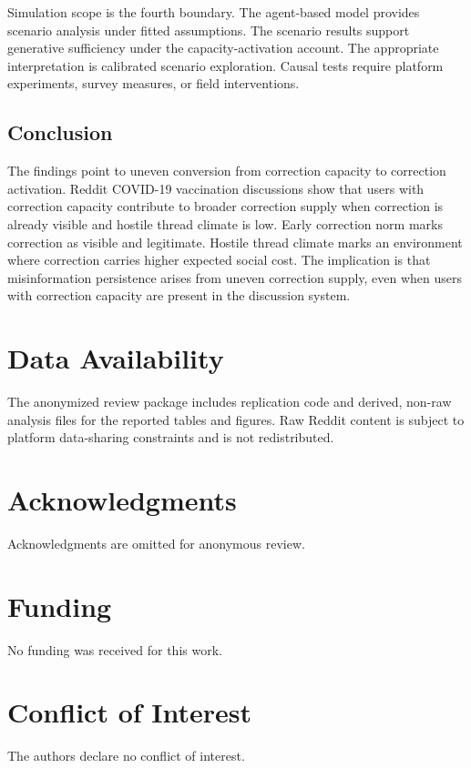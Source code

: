 \documentclass[namedate,unnumsec,webpdf,contemporary,large]{oup-authoring-template}
\begin{document}
Simulation scope is the fourth boundary. The agent-based model provides scenario analysis under fitted assumptions. The scenario results support generative sufficiency under the capacity-activation account. The appropriate interpretation is calibrated scenario exploration. Causal tests require platform experiments, survey measures, or field interventions.

\subsection{Conclusion}


The findings point to uneven conversion from correction capacity to correction activation. Reddit COVID-19 vaccination discussions show that users with correction capacity contribute to broader correction supply when correction is already visible and hostile thread climate is low. Early correction norm marks correction as visible and legitimate. Hostile thread climate marks an environment where correction carries higher expected social cost. The implication is that misinformation persistence arises from uneven correction supply, even when users with correction capacity are present in the discussion system.



\section*{Data Availability}

The anonymized review package includes replication code and derived, non-raw analysis files for the reported tables and figures. Raw Reddit content is subject to platform data-sharing constraints and is not redistributed.



\section*{Acknowledgments}

Acknowledgments are omitted for anonymous review.



\section*{Funding}

No funding was received for this work.



\section*{Conflict of Interest}

The authors declare no conflict of interest.






\end{document}

